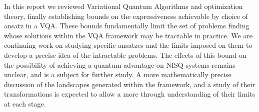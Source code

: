 
In this report we reviewed Variational Quantum Algorithms and optimization
theory, finally establishing bounds on the expressiveness achievable by choice
of ansatz in a VQA. 
%
These bounds fundamentally limit the set of problems finding whose solutions
within the VQA framework may be tractable in practice.
%
We are continuing work on studying specific ansatzes and the limits imposed on
them to develop a precise idea of the intractable problems. The effects of this
bound on the possibility of achieving a quantum advantage on NISQ systems
remains unclear, and is a subject for further study.
%
A more mathematically precise discussion of the landscapes generated within the
framework, and a study of their transformations is expected to allow a more
through understanding of their limits at each stage.
%
